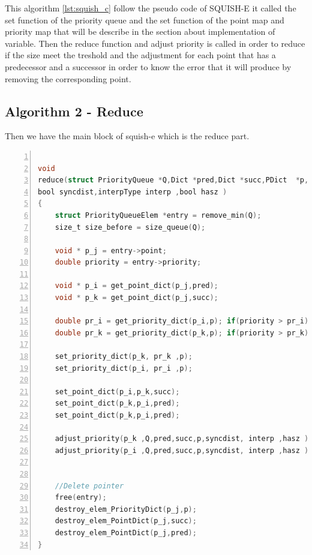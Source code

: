 This algorithm \ref{lst:squish_c} follow the pseudo code of SQUISH-E it called the set function of the priority queue and the set function of the point map and priority map that will be describe in the section about implementation of variable. Then the reduce function and adjust priority is called in order to reduce if the size meet the treshold and the adjustment for each point that has a predecessor and a successor in order to know the error that it will produce by removing the corresponding point.

\subsection{Algorithm 2 - Reduce}
Then we have the main block of squish-e which is the reduce part. 

\begin{minipage}{\linewidth}
\begin{lstlisting}[language=C, % Spécifie le langage du code
caption={reduce}, % Légende du listing
label=lst:reduce_c, % Étiquette pour référencer le listing
numbers=left,
numberstyle=\tiny\color{gray},
stepnumber=1,
frame=single,
breaklines=true,
postbreak=\mbox{\textcolor{red}{$\hookrightarrow$}\space},
showstringspaces=false
]

void
reduce(struct PriorityQueue *Q,Dict *pred,Dict *succ,PDict  *p,
bool syncdist,interpType interp ,bool hasz )
{
	struct PriorityQueueElem *entry = remove_min(Q);
	size_t size_before = size_queue(Q);
	
	void * p_j = entry->point;
	double priority = entry->priority;
	
	void * p_i = get_point_dict(p_j,pred);
	void * p_k = get_point_dict(p_j,succ);
	
	double pr_i = get_priority_dict(p_i,p); if(priority > pr_i){ pr_i = priority; }
	double pr_k = get_priority_dict(p_k,p); if(priority > pr_k){ pr_k = priority; }
	
	set_priority_dict(p_k, pr_k ,p);
	set_priority_dict(p_i, pr_i ,p);
	
	set_point_dict(p_i,p_k,succ);
	set_point_dict(p_k,p_i,pred);
	set_point_dict(p_k,p_i,pred);
	
	adjust_priority(p_k ,Q,pred,succ,p,syncdist, interp ,hasz );
	adjust_priority(p_i ,Q,pred,succ,p,syncdist, interp ,hasz );
	
	
	//Delete pointer
	free(entry);
	destroy_elem_PriorityDict(p_j,p);
	destroy_elem_PointDict(p_j,succ);
	destroy_elem_PointDict(p_j,pred);
}

\end{lstlisting}
 
\end{minipage}
\vspace{1cm}


